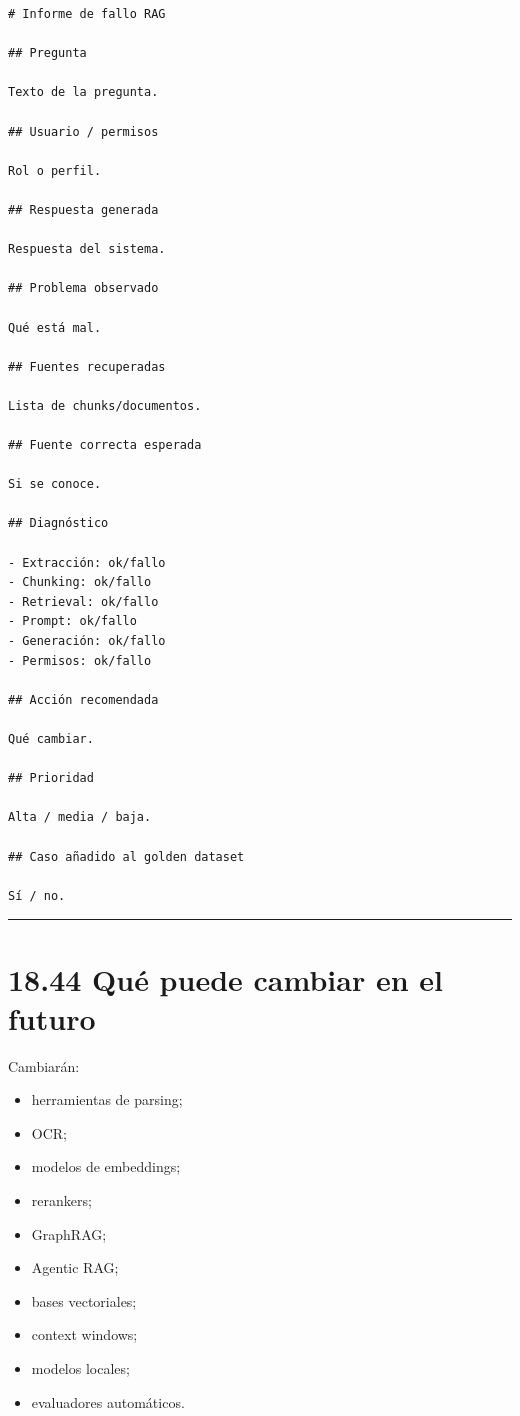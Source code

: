 \begin{lstlisting}
# Informe de fallo RAG

## Pregunta

Texto de la pregunta.

## Usuario / permisos

Rol o perfil.

## Respuesta generada

Respuesta del sistema.

## Problema observado

Qué está mal.

## Fuentes recuperadas

Lista de chunks/documentos.

## Fuente correcta esperada

Si se conoce.

## Diagnóstico

- Extracción: ok/fallo
- Chunking: ok/fallo
- Retrieval: ok/fallo
- Prompt: ok/fallo
- Generación: ok/fallo
- Permisos: ok/fallo

## Acción recomendada

Qué cambiar.

## Prioridad

Alta / media / baja.

## Caso añadido al golden dataset

Sí / no.
\end{lstlisting}

\begin{center}\rule{0.5\linewidth}{0.5pt}\end{center}

\section{18.44 Qué puede cambiar en el
futuro}\label{quuxe9-puede-cambiar-en-el-futuro-17}

Cambiarán:

\begin{itemize}
\tightlist
\item
  herramientas de parsing;
\item
  OCR;
\item
  modelos de embeddings;
\item
  rerankers;
\item
  GraphRAG;
\item
  Agentic RAG;
\item
  bases vectoriales;
\item
  context windows;
\item
  modelos locales;
\item
  evaluadores automáticos.
\end{itemize}

